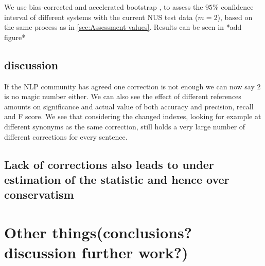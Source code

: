 \documentclass[11pt]{article}
\begin{document}
We use bias-corrected and accelerated bootstrap \cite{efron1987better}, to assess the $95\%$ confidence interval of different systems with the current NUS test data ($m=2$), based on the same process as in \ref{sec:Assessment-values}. Results can be seen in {*}add figure{*}

\subsection{discussion}

If the NLP community has agreed one correction is not enough\cite{tetreault2008native}
we can now say 2 is no magic number either. We can also see the effect of different references amounts on significance and actual value of both accuracy and precision, recall and F score.
We see that considering the changed indexes, looking for example at different synonyms as the same correction, still holds a very large number of different corrections for every sentence.


\subsection{Lack of corrections also leads to under estimation of the statistic
and hence over conservatism}

\section{Other things(conclusions? discussion further work?)}



\end{document}
